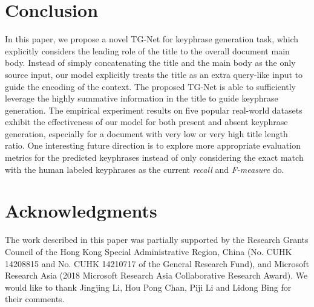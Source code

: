 \documentclass[letterpaper]{article} %
\begin{document}
\section{Conclusion} \label{section: conclusion}
In this paper, we propose a novel TG-Net for keyphrase generation task, which explicitly considers the leading role of the title to the overall document main body. Instead of simply concatenating the title and the main body as the only source input, our model explicitly treats the title as an extra query-like input to guide the encoding of the context. The proposed TG-Net is able to sufficiently leverage the highly summative information in the title to guide keyphrase generation. The empirical experiment results on five popular real-world datasets exhibit the effectiveness of our model for both present and absent keyphrase generation, especially for a document with very low or very high title length ratio. One interesting future direction is to explore more appropriate evaluation metrics for the predicted keyphrases instead of only considering the exact match with the human labeled keyphrases as the current \textit{recall} and \textit{F-measure} do.

\section{Acknowledgments}
The work described in this paper was partially supported
by the Research Grants Council of the Hong
Kong Special Administrative Region, China (No. CUHK
14208815 and No. CUHK 14210717 of the General Research
Fund), and Microsoft Research Asia (2018 Microsoft
Research Asia Collaborative Research Award). We would like to thank Jingjing Li, Hou Pong Chan, Piji Li and Lidong Bing for their comments.

\fontsize{9.0pt}{10.0pt} \selectfont


\end{document}
